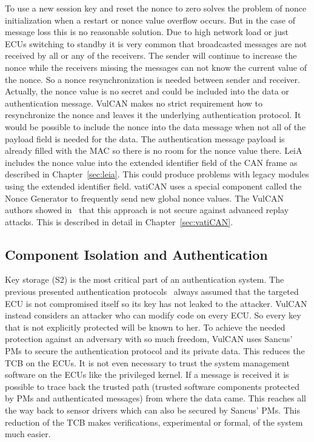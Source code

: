 To use a new session key and reset the nonce to zero solves the problem of nonce
initialization when a restart or nonce value overflow occurs. But in the case of
message loss this is no reasonable solution. Due to high network load or just
ECUs switching to standby it is very common that broadcasted messages are not
received by all or any of the receivers. The sender will continue to increase
the nonce while the receivers missing the messages can not know the current
value of the nonce. So a nonce resynchronization is needed between sender and
receiver. Actually, the nonce value is no secret and could be included into the
data or authentication message. VulCAN makes no strict requirement how to
resynchronize the nonce and leaves it the underlying authentication protocol. It
would be possible to include the nonce into the data message when not all of the
payload field is needed for the data. The authentication message payload is
already filled with the MAC so there is no room for the nonce value there. LeiA
includes the nonce value into the extended identifier field of the CAN frame as
described in Chapter~\ref{sec:leia}. This could produce problems with legacy
modules using the extended identifier field\@. vatiCAN uses a special component
called the Nonce Generator to frequently send new global nonce values. The
VulCAN authors showed in~\cite{VanBulck2017} that this approach is not secure
against advanced replay attacks. This is described in detail in
Chapter~\ref{sec:vatiCAN}.

\subsection{Component Isolation and Authentication}\label{subsec:vulcan-component-isolation}

Key storage (S2) is the most critical part of an authentication system. The
previous presented authentication
protocols~\cite{Koscher2010,Nurnberger2016,Hazem2012,Radu2016,Bruni2014} always
assumed that the targeted ECU is not compromised itself so its key has not
leaked to the attacker. VulCAN instead considers an attacker who can modify code
on every ECU\@. So every key that is not explicitly protected will be known to
her. To achieve the needed protection against an adversary with so much freedom,
VulCAN uses Sancus' PMs to secure the authentication protocol and its private
data. This reduces the TCB on the ECUs. It is not even necessary to trust the
system management software on the ECUs like the privileged kernel. If a message
is received it is possible to trace back the trusted path (trusted software
components protected by PMs and authenticated messages) from where the data
came. This reaches all the way back to sensor drivers which can also be secured
by Sancus' PMs. This reduction of the TCB makes verifications, experimental or
formal, of the system much easier.

